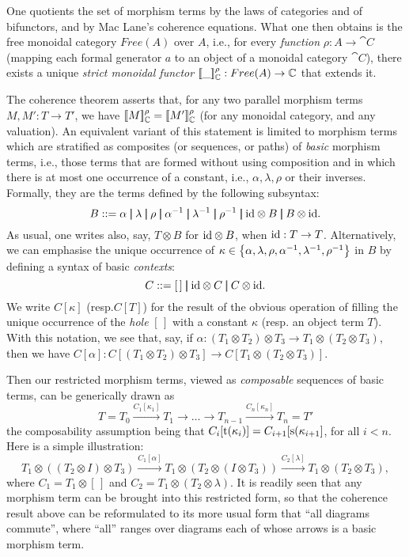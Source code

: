 One quotients the set of morphism terms by the laws of categories and of bifunctors, and by Mac Lane's coherence equations.
What one then obtains is the free monoidal category ${Free}(A)$ over $A$, i.e., for every {\em function} $\rho:A\rightarrow \cat{C}$ (mapping each formal generator $a$ to an object of  a monoidal category $\cat{C}$), there exists a unique {\em strict monoidal functor} $[\![ \_]\!]^\rho_{{\mathbb C}}:{Free}(A)\rightarrow{\mathbb C}$ that extends it.

The coherence theorem asserts that, for any two  parallel morphism terms $M,M':T\rightarrow T'$, we have $[\![ M]\!]^\rho_{{\mathbb C}}=[\![ M']\!]^\rho_{{\mathbb C}}$  (for any monoidal category, and any valuation). An equivalent variant of this statement is limited to morphism terms which are stratified as composites (or sequences, or paths) of {\em basic} morphism terms, i.e., those terms that are formed without using composition and in which there is at most one occurrence of a constant, i.e., $\alpha,\lambda,\rho$ or their inverses. Formally, they are the terms defined by the following subsyntax:
$$B ::= \alpha \Alt \lambda \Alt\rho\Alt  \alpha^{-1} \Alt \lambda^{-1} \Alt\rho^{-1} \Alt  \id\otimes B \Alt B\otimes \id.$$
As usual, one writes also, say, $T\otimes B$ for $\mathrm{id}\otimes B$, when $\mathrm{id}:T\rightarrow T$. Alternatively, we can emphasise the unique occurrence of $\kappa\in\left\{\alpha,\lambda,\rho,\alpha^{-1},\lambda^{-1},\rho^{-1}\right\}$ in $B$ by defining a syntax of basic {\em contexts}:
$$C ::= [\,] \mid\!\!\mid \mathrm{id}\otimes C \mid\!\!\mid C\otimes \mathrm{id}.$$
We  write  $C[\kappa]$ (resp.$C[T]$) for the result of the obvious operation of filling the unique occurrence of the {\em hole} $[\,]$ with a constant $\kappa$ (resp. an object term $T$). With this notation, we see that, say, if $\alpha:(T_1\otimes T_2)\otimes T_3\rightarrow T_1\otimes(T_2\otimes T_3)$, then we have
$C[\alpha]:C[(T_1\otimes T_2)\otimes T_3]\rightarrow C[T_1\otimes(T_2\otimes T_3)]$.

Then our restricted morphism terms, viewed as {\em composable} sequences of basic terms, can be generically drawn as $$T=T_0\stackrel{C_1[\kappa_1]}{\longrightarrow} T_1 \longrightarrow\dots \longrightarrow T_{n-1} \stackrel{C_n[\kappa_n]}{\longrightarrow} T_n=T'$$
the composability assumption being that  $C_i[{\text t}(\kappa_i)]=C_{i+1}[{\text s}(\kappa_{i+1}]$, for all $i<n$.
Here is a simple illustration:
$$T_1\otimes((T_2\otimes I)\otimes T_3)\stackrel{C_1[\alpha]}{\longrightarrow}  T_1\otimes(T_2\otimes (I\otimes T_3)) 
\stackrel{C_2[\lambda]}{\longrightarrow} T_1\otimes (T_2\otimes T_3),$$
where $C_1=T_1\otimes[\,]$ and $C_2=T_1\otimes(T_2\otimes\lambda)$.
It is readily seen that any morphism term can be brought into this restricted form, so that the coherence result above can be reformulated to its more usual form that ``all diagrams commute'', where ``all'' ranges over diagrams each of whose arrows is a basic morphism term.

